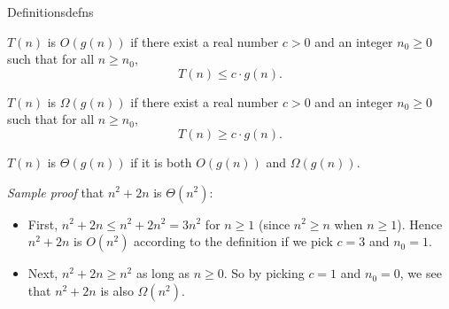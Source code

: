 \documentclass{tufte-handout}
\begin{document}
\newpage
\begin{model*}{Definitions}{defns}
  \begin{defn}[Big-O] 
    $T(n)$ is $O(g(n))$ if there exist a real number $c > 0$ and an
    integer $n_0 \geq 0$ such that for all $n \geq n_0$,
    \[ T(n) \leq c \cdot g(n). \]
  \end{defn}

  \begin{defn} 
    $T(n)$ is $\Omega(g(n))$ if there exist a real number $c > 0$ and an
    integer $n_0 \geq 0$ such that
    for all $n \geq n_0$, \[ T(n) \geq c \cdot g(n). \]
  \end{defn}

  \begin{defn} 
    $T(n)$ is $\Theta(g(n))$ if it is both $O(g(n))$ and $\Omega(g(n))$.
  \end{defn}

  \emph{Sample proof} that $n^2 + 2n$ is $\Theta(n^2)$:
  \begin{itemize}
  \item First, $n^2 + 2n \leq n^2 + 2n^2 = 3n^2$ for $n \geq 1$ (since
    $n^2 \geq n$ when $n \geq 1$).  Hence $n^2 + 2n$ is $O(n^2)$
    according to the definition if we pick $c = 3$ and $n_0 = 1$.
  \item Next, $n^2 + 2n \geq n^2$ as long as $n \geq 0$.  So by
    picking $c = 1$ and $n_0 = 0$, we see that $n^2 + 2n$ is also
    $\Omega(n^2)$.
  \end{itemize}
\end{model*}
\end{document}
